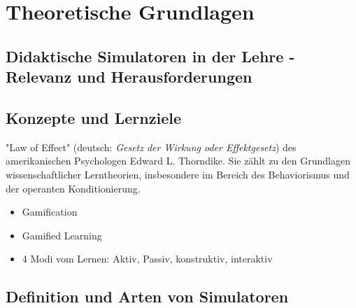 \chapter{Theoretische Grundlagen}

\section{Didaktische Simulatoren in der Lehre - Relevanz und Herausforderungen}

\section{Konzepte und Lernziele}


"Law of Effect" (deutsch: \textit{Gesetz der Wirkung oder Effektgesetz}) des amerikanischen Psychologen Edward L. Thorndike. Sie zählt zu den Grundlagen wissenschaftlicher Lerntheorien, insbesondere im Bereich des Behaviorismus und der operanten Konditionierung.

\begin{itemize}
    \item Gamification
    \item Gamified Learning
    \item 4 Modi vom Lernen: Aktiv, Passiv, konstruktiv, interaktiv
\end{itemize}

\section{Definition und Arten von Simulatoren}
